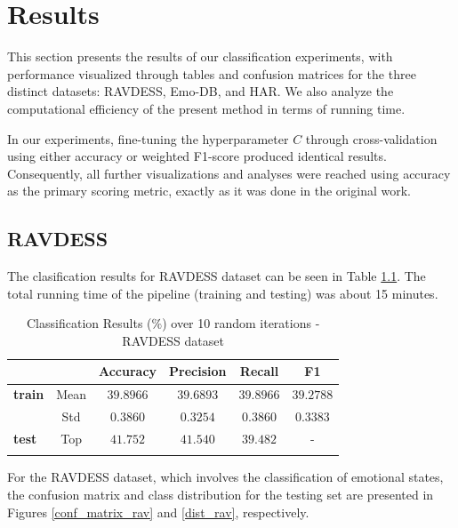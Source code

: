 \chapter{Results} \label{chap:res}

This section presents the results of our classification experiments, with performance visualized through tables and confusion matrices for the three distinct datasets: RAVDESS, Emo-DB, and HAR. We also analyze the computational efficiency of the present method in terms of running time.

In our experiments, fine-tuning the hyperparameter $C$ through cross-validation using either accuracy or weighted F1-score produced identical results. Consequently, all further visualizations and analyses were reached using accuracy as the primary scoring metric, exactly as it was done in the original work.

\section{RAVDESS}
The clasification results for RAVDESS dataset can be seen in Table \ref{rav_results}. The total running time of the pipeline (training and testing) was about 15 minutes.

\begin{table}[h!]
\centering
\caption{Classification Results ($\%$) over 10 random iterations - RAVDESS dataset}
\begin{tabular}{lccccc}
\hline
 &  & Accuracy & Precision & Recall & F1 \\
\hline
\textbf{train} & Mean  & $39.8966$  & $39.6893$  & $39.8966$  & $39.2788$  \\
& Std   & $0.3860$  & $0.3254$  & $0.3860$  & $0.3383$  \\
\hline
\textbf{test}  & Top  & $41.752$   & $41.540$   & $39.482$   & -           \\
\hline
\label{rav_results}
\end{tabular}
\end{table}

For the RAVDESS dataset, which involves the classification of emotional states, the confusion matrix and class distribution for the testing set are presented in Figures \ref{conf_matrix_rav} and \ref{dist_rav}, respectively.

